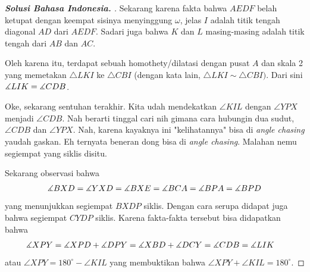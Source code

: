 \begin{proof}[\textbf{Solusi Bahasa Indonesia. }]
Sekarang karena fakta bahwa $AEDF$ belah ketupat dengan keempat sisinya menyinggung $\omega$, jelas $I$ adalah titik tengah diagonal $AD$ dari $AEDF$. Sadari juga bahwa $K$ dan $L$ masing-masing adalah titik tengah dari $AB$ dan $AC$.

Oleh karena itu, terdapat sebuah homothety/dilatasi dengan pusat $A$ dan skala 2 yang memetakan $\triangle LKI$ ke $\triangle CBI$ (dengan kata lain, $\triangle LKI \sim \triangle CBI)$. Dari sini $\measuredangle LIK = \measuredangle CDB$. 

\begin{remark*}
    Oke, sekarang sentuhan terakhir. Kita udah mendekatkan $\angle KIL$ dengan $\angle YPX$ menjadi $\angle CDB$. Nah berarti tinggal cari nih gimana cara hubungin dua sudut, $\angle CDB$ dan $\angle YPX$. Nah, karena kayaknya ini "kelihatannya" bisa di \textit{angle chasing} yaudah gaskan. Eh ternyata beneran dong bisa di \textit{angle chasing}. Malahan nemu segiempat yang siklis disitu.
\end{remark*}
Sekarang observasi bahwa
\begin{align*}
    \measuredangle BXD = \measuredangle YXD = \measuredangle BXE = \measuredangle BCA = \measuredangle BPA = \measuredangle BPD
\end{align*}
yang menunjukkan segiempat $BXDP$ siklis. Dengan cara serupa didapat juga bahwa segiempat $CYDP$ siklis. Karena fakta-fakta tersebut bisa didapatkan bahwa
\begin{align*}
    \measuredangle XPY &= \measuredangle XPD + \measuredangle DPY = \measuredangle XBD +\measuredangle DCY = \measuredangle CDB = \measuredangle LIK
\end{align*}
atau $\angle XPY = 180^\circ - \angle KIL$ yang membuktikan bahwa $\angle XPY + \angle KIL = 180^\circ$.

\end{proof}
